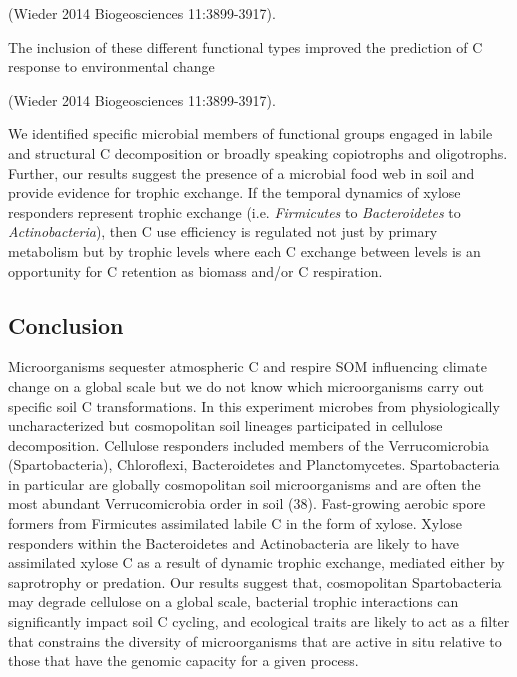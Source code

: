 (Wieder 2014 Biogeosciences 11:3899-3917). 

The inclusion of these different functional types improved the
prediction of C response to environmental change 

(Wieder 2014 Biogeosciences 11:3899-3917). 

We identified specific microbial members of functional groups engaged in labile
and structural C decomposition or broadly speaking copiotrophs and oligotrophs.
Further, our results suggest the presence of a microbial food web in soil and
provide evidence for  trophic exchange. If the temporal dynamics of xylose
responders represent trophic exchange (i.e. \textit{Firmicutes} to
\textit{Bacteroidetes} to \textit{Actinobacteria}), then C use efficiency is
regulated not just by primary metabolism but by trophic levels where each
C exchange between levels is an opportunity for C retention as biomass and/or
C respiration. 

\subsection{Conclusion} 
Microorganisms sequester atmospheric C and respire SOM influencing climate
change on a global scale but we do not know which microorganisms carry out
specific soil C transformations. In this experiment microbes from
physiologically uncharacterized but cosmopolitan soil lineages participated in
cellulose decomposition. Cellulose responders included members of the
Verrucomicrobia (Spartobacteria), Chloroflexi, Bacteroidetes and
Planctomycetes. Spartobacteria in particular are globally cosmopolitan soil
microorganisms and are often the most abundant Verrucomicrobia order in soil
(38). Fast-growing aerobic spore formers from Firmicutes assimilated labile
C in the form of xylose. Xylose responders within the Bacteroidetes and
Actinobacteria are likely to have assimilated xylose C as a result of dynamic
trophic exchange, mediated either by saprotrophy or predation. Our results
suggest that, cosmopolitan Spartobacteria may degrade cellulose on a global
scale, bacterial trophic interactions can significantly impact soil C cycling,
and ecological traits are likely to act as a filter that constrains the
diversity of microorganisms that are active in situ relative to those that have
the genomic capacity for a given process.
